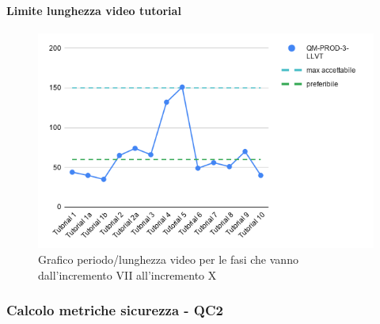 \paragraph{Limite lunghezza video tutorial}
\begin{figure}[H]
			\centering
			\includegraphics[width=0.8\linewidth]{./res/images/LLVT.png}
			\caption{Grafico periodo/lunghezza video per le fasi che vanno dall'incremento VII all'incremento X}
			\label{fig:Grafico periodo/lunghezza video per le fasi che vanno dall'incremento VII all'incremento X}
	\end{figure}

\subsubsection{Calcolo metriche sicurezza - QC2}
